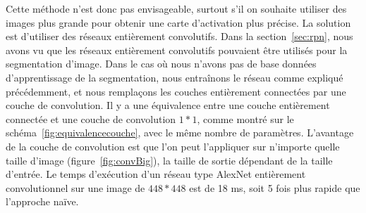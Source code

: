Cette méthode n’est donc pas envisageable, surtout s’il on souhaite utiliser des images plus grande pour obtenir une carte d'activation plus précise.
La solution est d’utiliser des réseaux entièrement convolutifs.
Dans la section~\ref{sec:rpn}, nous avons vu que les réseaux entièrement convolutifs pouvaient être utilisés pour la segmentation d'image.
Dans le cas où nous n'avons pas de base données d'apprentissage de la segmentation, nous entraînons le réseau comme expliqué précédemment, et nous remplaçons les couches entièrement connectées par une couche de convolution.
Il y a une équivalence entre une couche entièrement connectée et une couche de convolution $1*1$, comme montré sur le schéma~\ref{fig:equivalencecouche}, avec le même nombre de paramètres.
L'avantage de la couche de convolution est que l'on peut l'appliquer sur n'importe quelle taille d'image (figure~\ref{fig:convBig}), la taille de sortie dépendant de la taille d’entrée.
Le temps d'exécution d’un réseau type AlexNet entièrement convolutionnel sur une image de $448*448$ est de 18 ms, soit 5 fois plus rapide que l’approche naïve.



